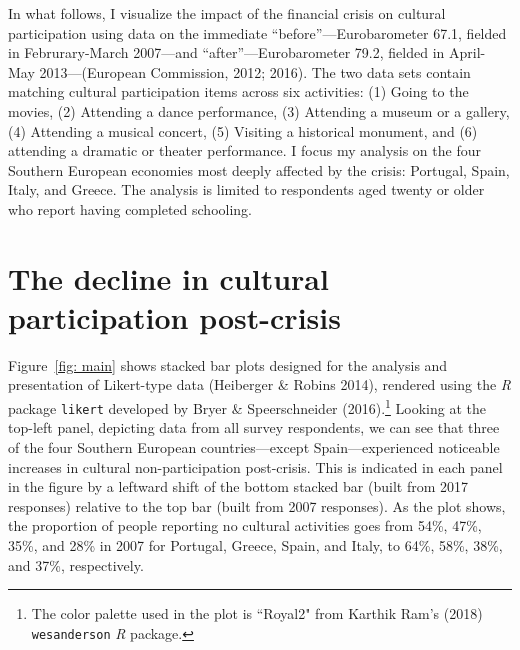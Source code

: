 \documentclass{article}
\begin{document}
In what follows, I visualize the impact of the financial crisis on cultural participation using data on the immediate ``before''---Eurobarometer 67.1, fielded in Februrary-March 2007---and ``after''---Eurobarometer 79.2, fielded in April-May 2013---(European Commission, 2012; 2016). The two data sets contain matching cultural participation items across six activities: (1) Going to the movies, (2) Attending a dance performance, (3) Attending a museum or a gallery, (4) Attending a musical concert, (5) Visiting a historical monument, and (6) attending a dramatic or theater performance. I focus my analysis on the four Southern European economies most deeply affected by the crisis: Portugal, Spain, Italy, and Greece. The analysis is limited to respondents aged twenty or older who report having completed schooling. 

\section{The decline in cultural participation post-crisis}
Figure~\ref{fig: main} shows stacked bar plots designed for the analysis and presentation of Likert-type data (Heiberger \& Robins 2014), rendered using the {\em} {\em R} package \texttt{likert} developed by Bryer \& Speerschneider (2016).\footnote{The color palette used in the plot is ``Royal2" from Karthik Ram's (2018) \texttt{wesanderson} {\em R} package.}  Looking at the top-left panel, depicting data from all survey respondents, we can see that three of the four Southern European countries---except Spain---experienced noticeable increases in cultural non-participation post-crisis. This is indicated in each panel in the figure by a leftward shift of the bottom stacked bar (built from 2017 responses) relative to the top bar (built from 2007 responses). As the plot shows, the proportion of people reporting no cultural activities goes from 54\%, 47\%, 35\%, and 28\% in 2007 for Portugal, Greece, Spain, and Italy, to 64\%, 58\%, 38\%, and 37\%, respectively. 
\end{document}
